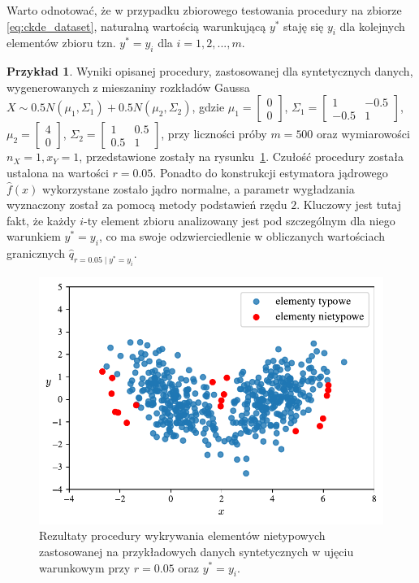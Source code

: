 \documentclass[12pt,a4paper,oneside]{book}
\theoremstyle{definition}
\newtheorem{exmp}{Przykład}[chapter]
\begin{document}
Warto odnotować, że w przypadku zbiorowego testowania procedury na zbiorze \eqref{eq:ckde_dataset}, naturalną wartością warunkującą $y^*$ staję się $y_i$ dla kolejnych elementów zbioru tzn. $y^*=y_i$ dla $i=1,2,...,m$.

\begin{exmp} \label{exmp:outliers_detection_example2}
Wyniki opisanej procedury, zastosowanej dla syntetycznych danych, wygenerowanych z mieszaniny rozkładów Gaussa $X \sim 0.5 N(\mu_1,\Sigma_1) + 0.5 N(\mu_2,\Sigma_2)$, gdzie $\mu_1=\begin{bmatrix} 0 \\ 0 \end{bmatrix}$, $\Sigma_1=\begin{bmatrix} 1 & -0.5 \\ -0.5 & 1 \end{bmatrix}$, $\mu_2=\begin{bmatrix} 4 \\ 0 \end{bmatrix}$, $\Sigma_2=\begin{bmatrix} 1 & 0.5 \\ 0.5 & 1 \end{bmatrix}$, przy liczności próby $m=500$ oraz wymiarowości $n_X=1, x_Y=1$, przedstawione zostały na rysunku~\ref{fig:outliers_detection_example2}. Czułość procedury została ustalona na wartości $r=0.05$. Ponadto do konstrukcji estymatora jądrowego $\hat{f}(x)$ wykorzystane zostało jądro normalne, a parametr wygładzania wyznaczony został za pomocą metody podstawień rzędu $2$. Kluczowy jest tutaj fakt, że każdy $i$-ty element zbioru analizowany jest pod szczególnym dla niego warunkiem $y^*=y_i$, co ma swoje odzwierciedlenie w obliczanych wartościach granicznych $\hat{q}_{r=0.05 \mid y^*=y_i}$.
\begin{figure}[H]
    \centering
    \includegraphics[scale=0.69]{outliers_detection_example2}
    \vspace{-0.5cm} 
    \caption{Rezultaty procedury wykrywania elementów nietypowych zastosowanej na przykładowych danych syntetycznych w ujęciu warunkowym przy $r=0.05$ oraz $y^*=y_i$.}
    \label{fig:outliers_detection_example2}
\end{figure}
\end{exmp}
\end{document}
